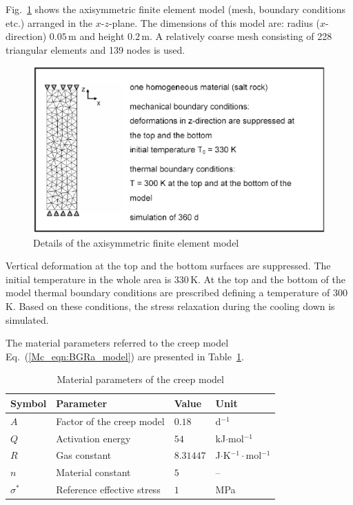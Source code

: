 Fig.~\ref{Mc_fig:creep_salt_2} shows the axisymmetric finite element model (mesh, boundary conditions etc.) arranged in the $x$-$z$-plane. The dimensions of this model are: radius ($x$-direction) $0.05\,$m and height $0.2\,$m. A relatively coarse mesh consisting of 228 triangular elements and 139 nodes is used.
%
\begin{figure}[htb]
\centering
\includegraphics[scale=0.5]{PART_II/M/creep_salt_2}
\caption{Details of the axisymmetric finite element model} \label{Mc_fig:creep_salt_2}
\end{figure}

Vertical deformation at the top and the bottom surfaces are suppressed. The initial temperature in the
whole area is $330\,$K. At the top and the bottom of the model thermal boundary conditions are prescribed defining a temperature of $300\,$K. Based on these conditions, the stress relaxation during the cooling down is simulated.

The material parameters referred to the creep model Eq.~(\ref{Mc_eqn:BGRa_model}) are presented in Table~\ref{Mc_tab:creep_salt}.
%
\begin{table}[!htb]
\centering
\caption{Material parameters of the creep model}
\label{Mc_tab:creep_salt}
\begin{tabular}{llll}
\toprule
Symbol & Parameter & Value & Unit \\
\midrule
$A$        & Factor of the creep model  & $0.18$    & d$^{-1}$                        \\
$Q$        & Activation energy          & $54$      & kJ$\cdot$mol$^{-1}$             \\
$R$        & Gas constant               & $8.31447$ & J$\cdot$K$^{-1}\cdot$mol$^{-1}$ \\
$n$        & Material constant          & $5$       & --                              \\
$\sigma^*$ & Reference effective stress & $1$       & MPa                             \\
\bottomrule
\end{tabular}
\end{table}

